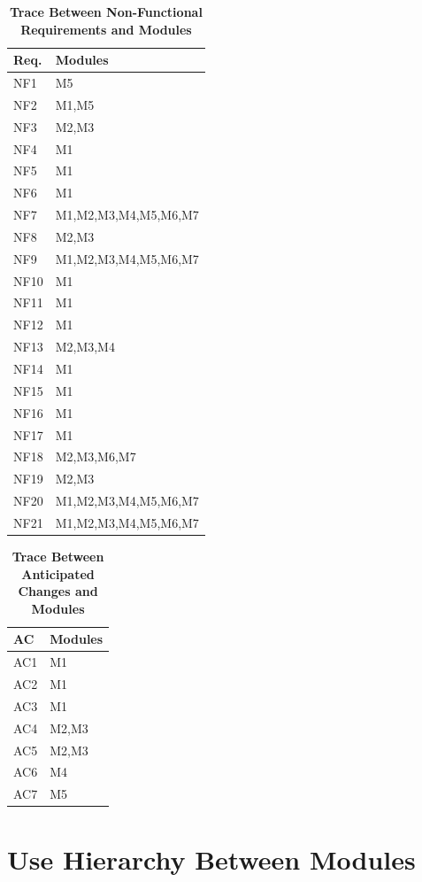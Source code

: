 \documentclass[12pt, titlepage]{article}
\begin{document}
\begin{table}[H]
\centering
\begin{tabular}{p{} p{}}
\toprule
\textbf{Req.} & \textbf{Modules}\\
\midrule
NF1 & M5\\
NF2 & M1,M5\\
NF3 & M2,M3\\
NF4 & M1\\
NF5 & M1\\
NF6 & M1\\
NF7 & M1,M2,M3,M4,M5,M6,M7\\
NF8 & M2,M3\\
NF9 & M1,M2,M3,M4,M5,M6,M7\\
NF10 & M1\\
NF11 & M1\\
NF12 & M1\\
NF13 & M2,M3,M4\\
NF14 & M1\\
NF15 & M1\\
NF16 & M1\\
NF17 & M1\\
NF18 & M2,M3,M6,M7\\
NF19 & M2,M3\\
NF20 & M1,M2,M3,M4,M5,M6,M7\\
NF21 & M1,M2,M3,M4,M5,M6,M7\\
\bottomrule
\end{tabular}
\caption{\bf Trace Between Non-Functional Requirements and Modules}
\label{TblRT}
\end{table}

\begin{table}[H]
\centering
\begin{tabular}{p{} p{}}
\toprule
\textbf{AC} & \textbf{Modules}\\
\midrule
AC1 & M1\\
AC2 & M1\\
AC3 & M1\\
AC4 & M2,M3\\
AC5 & M2,M3\\
AC6 & M4\\
AC7 & M5\\
\bottomrule
\end{tabular}
\caption{\bf Trace Between Anticipated Changes and Modules}
\label{TblRT}
\end{table}


\section{Use Hierarchy Between Modules} \label{SecUse}
\end{document}
